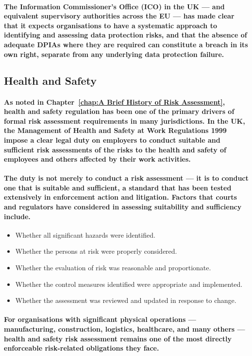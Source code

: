 \paragraph{The Information Commissioner's Office (ICO) in the UK — and equivalent supervisory authorities across the EU — has made clear that it expects organisations to have a systematic approach to identifying and assessing data protection risks, and that the absence of adequate DPIAs where they are required can constitute a breach in its own right, separate from any underlying data protection failure.}

\subsection{Health and Safety}
\paragraph{As noted in Chapter~\ref{chap:A Brief History of Risk Assessment}, health and safety regulation has been one of the primary drivers of formal risk assessment requirements in many jurisdictions. In the UK, the \textbf{Management of Health and Safety at Work Regulations 1999} impose a clear legal duty on employers to conduct suitable and sufficient risk assessments of the risks to the health and safety of employees and others affected by their work activities.}
\paragraph{The duty is not merely to conduct a risk assessment — it is to conduct one that is \textbf{suitable and sufficient}, a standard that has been tested extensively in enforcement action and litigation. Factors that courts and regulators have considered in assessing suitability and sufficiency include.}
\begin{itemize}
    \item{Whether all significant hazards were identified.}
    \item{Whether the persons at risk were properly considered.}
    \item{Whether the evaluation of risk was reasonable and proportionate.}
    \item{Whether the control measures identified were appropriate and implemented.}
    \item{Whether the assessment was reviewed and updated in response to change.}
\end{itemize}
\paragraph{For organisations with significant physical operations — manufacturing, construction, logistics, healthcare, and many others — health and safety risk assessment remains one of the most directly enforceable risk-related obligations they face.}

